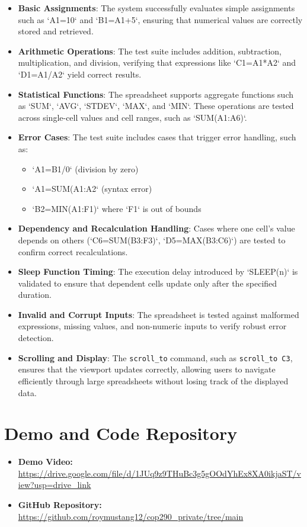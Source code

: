\documentclass[a4paper,12pt]{article}
\begin{document}
\begin{itemize}
    \item \textbf{Basic Assignments}: The system successfully evaluates simple assignments such as `A1=10` and `B1=A1+5`, ensuring that numerical values are correctly stored and retrieved.
    
    \item \textbf{Arithmetic Operations}: The test suite includes addition, subtraction, multiplication, and division, verifying that expressions like `C1=A1*A2` and `D1=A1/A2` yield correct results.
    
    \item \textbf{Statistical Functions}: The spreadsheet supports aggregate functions such as `SUM`, `AVG`, `STDEV`, `MAX`, and `MIN`. These operations are tested across single-cell values and cell ranges, such as `SUM(A1:A6)`.
    
    \item \textbf{Error Cases}: The test suite includes cases that trigger error handling, such as:
        \begin{itemize}
            \item `A1=B1/0` (division by zero)
            \item `A1=SUM(A1:A2` (syntax error)
            \item `B2=MIN(A1:F1)` where `F1` is out of bounds
        \end{itemize}
    
    \item \textbf{Dependency and Recalculation Handling}: Cases where one cell’s value depends on others (`C6=SUM(B3:F3)`, `D5=MAX(B3:C6)`) are tested to confirm correct recalculations.
    
    \item \textbf{Sleep Function Timing}: The execution delay introduced by `SLEEP(n)` is validated to ensure that dependent cells update only after the specified duration.
    
    \item \textbf{Invalid and Corrupt Inputs}: The spreadsheet is tested against malformed expressions, missing values, and non-numeric inputs to verify robust error detection.
    
       \item \textbf{Scrolling and Display}: The \texttt{scroll\_to} command, such as \texttt{scroll\_to C3}, ensures that the viewport updates correctly, allowing users to navigate efficiently through large spreadsheets without losing track of the displayed data.
\end{itemize}



\section{Demo and Code Repository}
\begin{itemize}
    \item \textbf{Demo Video:} \url{https://drive.google.com/file/d/1JUq9z9THuBc3g5gOOdYhEx8XA0ikjaST/view?usp=drive_link}
    \item \textbf{GitHub Repository:} \url{https://github.com/roymustang12/cop290_private/tree/main}
\end{itemize}
\end{document}
